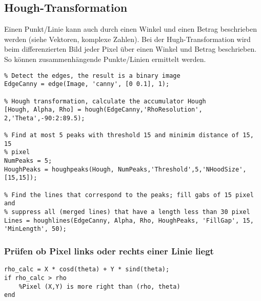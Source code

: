 \subsection{Hough-Transformation}
Einen Punkt/Linie kann auch durch einen Winkel und einen Betrag beschrieben werden (siehe Vektoren, komplexe Zahlen). Bei der Hugh-Transformation wird beim differenzierten Bild jeder Pixel über einen Winkel und Betrag beschrieben. So können zusammenhängende Punkte/Linien ermittelt werden.
\begin{lstlisting}
% Detect the edges, the result is a binary image
EdgeCanny = edge(Image, 'canny', [0 0.1], 1);

% Hough transformation, calculate the accumulator Hough
[Hough, Alpha, Rho] = hough(EdgeCanny,'RhoResolution', 2,'Theta',-90:2:89.5);

% Find at most 5 peaks with threshold 15 and minimim distance of 15, 15
% pixel
NumPeaks = 5;
HoughPeaks = houghpeaks(Hough, NumPeaks,'Threshold',5,'NHoodSize',[15,15]);

% Find the lines that correspond to the peaks; fill gabs of 15 pixel and
% suppress all (merged lines) that have a length less than 30 pixel
Lines = houghlines(EdgeCanny, Alpha, Rho, HoughPeaks, 'FillGap', 15, 'MinLength', 50);
\end{lstlisting}

\subsubsection{Prüfen ob Pixel links oder rechts einer Linie liegt}
\begin{lstlisting}
rho_calc = X * cosd(theta) + Y * sind(theta);
if rho_calc > rho
    %Pixel (X,Y) is more right than (rho, theta)
end
\end{lstlisting}
